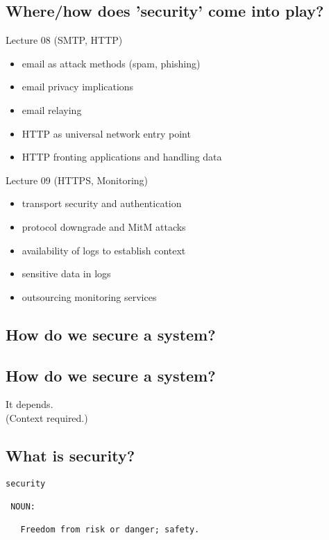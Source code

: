 \documentclass[xga]{xdvislides}
\begin{document}
\subsection{Where/how does 'security' come into play?}
Lecture 08 (SMTP, HTTP)
\begin{itemize}
	\item email as attack methods (spam, phishing)
	\item email privacy implications
	\item email relaying
	\item HTTP as universal network entry point
	\item HTTP fronting applications and handling data
\end{itemize}
\vspace{.5in}
Lecture 09 (HTTPS, Monitoring)
\begin{itemize}
	\item transport security and authentication
	\item protocol downgrade and MitM attacks
	\item availability of logs to establish context
	\item sensitive data in logs
	\item outsourcing monitoring services
\end{itemize}

\subsection{How do we secure a system?}

\subsection{How do we secure a system?}
\Huge
\vspace*{\fill}
\begin{center}
	It depends. \\
\vspace{.5in}
\Normalsize
	(Context required.)
\end{center}
\vspace*{\fill}

\subsection{What is security?}
\Huge
\begin{verbatim}
security

 NOUN:

   Freedom from risk or danger; safety.
\end{verbatim}
\Normalsize
\end{document}
